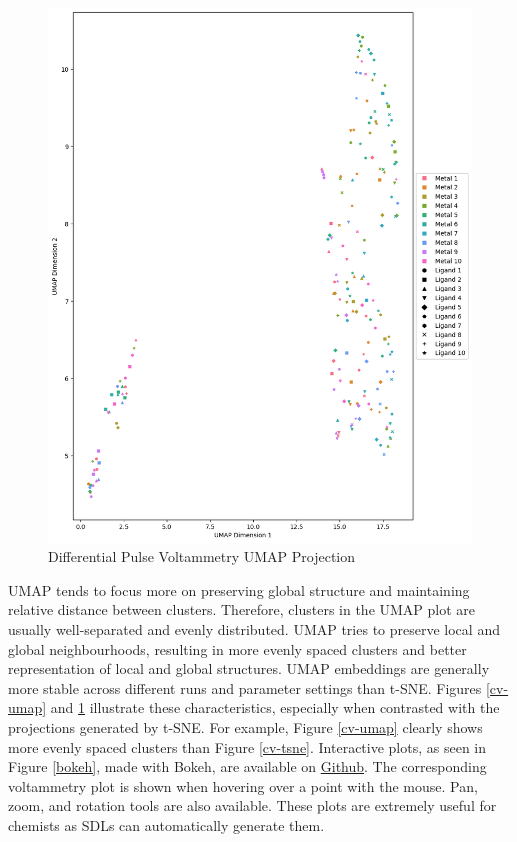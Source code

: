 \begin{figure}[H]
  \centering
    \includegraphics[width=1.0\textwidth]{figures/dpv_umap.png}
    \caption{Differential Pulse Voltammetry UMAP Projection}
    \label{dpv-umap}
\end{figure}
UMAP tends to focus more on preserving global structure and maintaining relative distance between clusters. Therefore, clusters in the UMAP plot are usually well-separated and evenly distributed. UMAP tries to preserve local and global neighbourhoods, resulting in more evenly spaced clusters and better representation of local and global structures. UMAP embeddings are generally more stable across different runs and parameter settings than t-SNE. Figures \ref{cv-umap} and \ref{dpv-umap} illustrate these characteristics, especially when contrasted with the projections generated by t-SNE. For example, Figure \ref{cv-umap} clearly shows more evenly spaced clusters than Figure \ref{cv-tsne}. Interactive plots, as seen in Figure \ref{bokeh}, made with Bokeh, are available on \href{https://github.com/raineyfu/Thesis}{Github}. The corresponding voltammetry plot is shown when hovering over a point with the mouse. Pan, zoom, and rotation tools are also available. These plots are extremely useful for chemists as SDLs can automatically generate them.
